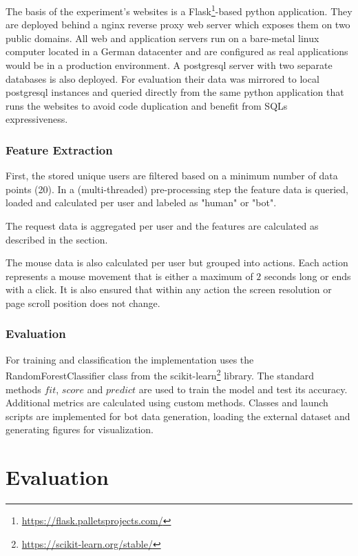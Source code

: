 \documentclass[
    fontsize=12pt,
    headings=small,
    parskip=half,           %
    bibliography=totoc,
    numbers=noenddot,       %
    open=any,               %
    final,                   %
    table
]{scrreprt}
\begin{document}
The basis of the experiment's websites is a Flask\footnote{\url{https://flask.palletsprojects.com/}}-based python application. They are deployed behind a nginx reverse proxy web server which exposes them on two public domains. All web and application servers run on a bare-metal linux computer located in a German datacenter and are configured as real applications would be in a production environment. A postgresql server with two separate databases is also deployed. For evaluation their data was mirrored to local postgresql instances and queried directly from the same python application that runs the websites to avoid code duplication and benefit from SQLs expressiveness.

\subsection{Feature Extraction}

First, the stored unique users are filtered based on a minimum number of data points (20). In a (multi-threaded) pre-processing step the feature data is queried, loaded and calculated per user and labeled as "human" or "bot".

The request data is aggregated per user and the features are calculated as described in the  section.

The mouse data is also calculated per user but grouped into actions. Each action represents a mouse movement that is either a maximum of $2$ seconds long or ends with a click. It is also ensured that within any action the screen resolution or page scroll position does not change.

\subsection{Evaluation}

For training and classification the implementation uses the RandomForestClassifier class from the scikit-learn\footnote{\url{https://scikit-learn.org/stable/}} library. The standard methods $fit$, $score$ and $predict$ are used to train the model and test its accuracy. Additional metrics are calculated using custom methods. Classes and launch scripts are implemented for bot data generation, loading the external dataset and generating figures for visualization.


\chapter{Evaluation}
\end{document}
